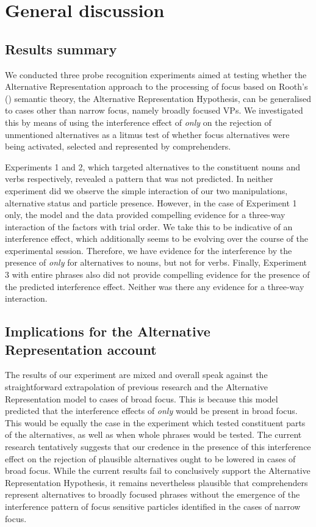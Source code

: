 \documentclass[output=paper,colorlinks,citecolor=brown]{langscibook}
\begin{document}
\section{General discussion}

\subsection{Results summary}

We conducted three probe recognition experiments aimed at testing whether the Alternative Representation approach to the processing of focus based on Rooth’s (\citeyear{rooth1992}) semantic theory, the Alternative Representation Hypothesis, can be generalised to cases other than narrow focus, namely broadly focused VPs. We investigated this by means of using the interference effect of \textit{only} on the rejection of unmentioned alternatives \citep{gotzner2016impact,gotzner2017role} as a litmus test of whether focus alternatives were being activated, selected and represented by comprehenders.

Experiments 1 and 2, which targeted alternatives to the constituent nouns and verbs respectively, revealed a pattern that was not predicted. In neither experiment did we observe the simple interaction of our two manipulations, alternative status and particle presence. However, in the case of Experiment 1 only, the model and the data provided compelling evidence for a three-way interaction of the factors with trial order. We take this to be indicative of an interference effect, which additionally seems to be evolving over the course of the experimental session. Therefore, we have evidence for the interference by the presence of \textit{only} for alternatives to nouns, but not for verbs. Finally, Experiment 3 with entire phrases also did not provide compelling evidence for the presence of the predicted interference effect. Neither was there any evidence for a three-way interaction.


\subsection{Implications for the Alternative Representation account}

The results of our experiment are mixed and overall speak against the straightforward extrapolation of previous research and the Alternative Representation model to cases of broad focus. This is because this model predicted that the interference effects of \textit{only} would be present in broad focus. This would be equally the case in the experiment which tested constituent parts of the alternatives, as well as when whole phrases would be tested. The current research tentatively suggests that our credence in the presence of this interference effect on the rejection of plausible alternatives ought to be lowered in cases of broad focus. While the current results fail to conclusively support the Alternative Representation Hypothesis, it remains nevertheless plausible that comprehenders represent alternatives to broadly focused phrases without the emergence of the interference pattern of focus sensitive particles identified in the cases of narrow focus. 
\end{document}
